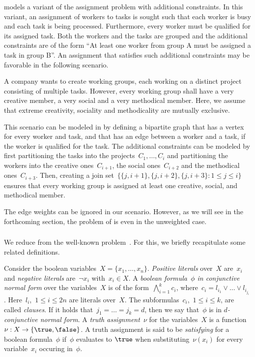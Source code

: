\begin{example}
  \pCBMs{} models a variant of the assignment problem with additional constraints. In this variant, an assignment of workers to tasks is sought such that each worker is busy and each task is being processed. Furthermore, every worker must be qualified for its assigned task. Both the workers and the tasks are grouped and the additional constraints are of the form ``At least one worker from group A must be assigned a task in group B''. An assignment that satisfies such additional constraints may be favorable in the following scenario. 

A company wants to create working groups, each working on a distinct project consisting of multiple tasks. However, every working group shall have a very creative member, a very social and a very methodical member. Here, we assume that extreme creativity, sociality and methodicality are mutually exclusive. 

This scenario can be modeled in \pCBMs{} by defining a bipartite graph that has a vertex for every worker and task, and that has an edge between a worker and a task, if the worker is qualified for the task. The additional constraints can be modeled by first partitioning the tasks into the projects~$C_1, \ldots, C_i$ and partitioning the workers into the creative ones~$C_{i + 1}$, the social ones~$C_{i + 2}$ and the methodical ones~$C_{i+3}$. Then, creating a join set~$\{\{j, i+ 1\}, \{j, i + 2\}, \{j, i + 3\}: 1 \leq j \leq i\}$ ensures that every working group is assigned at least one creative, social, and methodical member. 

The edge weights can be ignored in our scenario. However, as we will see in the forthcoming section, the problem of \pCBMs{} is \NPh{} even in the unweighted case.

\end{example}

\subsubsection{\NPHs}

We reduce from the well-known \ptSATs{} problem~\cite{Kar72}. For this, we briefly recapitulate some related definitions.
\begin{definition}
Consider the boolean variables~$X = \{x_1, \ldots, x_n\}$. \emph{Positive literals} over~$X$ are~$x_i$ and \emph{negative literals} are~$\neg x_i$ with~$x_i \in X$. A \emph{boolean formula~$\phi$ in conjunctive normal form} over the variables~$X$ is of the form~$\bigwedge_{i = 1}^kc_i$, where~$c_i = l_{i_1} \vee \ldots \vee l_{i_{j_i}}$. Here~$l_i$,~$1 \leq i \leq 2n$ are literals over~$X$. The subformulas~$c_i$,~$1\leq i \leq k$, are called \emph{clauses}. If it holds that~$j_1 = \ldots = j_k = d$, then we say that~$\phi$ is in \emph{$d$-conjunctive normal form}. A \emph{truth assignment}~$\nu$ for the variables~$X$ is a function~$\nu: X \rightarrow \{\true, \false\}$. A truth assignment is said to be \emph{satisfying} for a boolean formula~$\phi$ if~$\phi$ evaluates to $\true$ when substituting~$\nu(x_i)$ for every variable~$x_i$ occuring in~$\phi$.
\end{definition}

